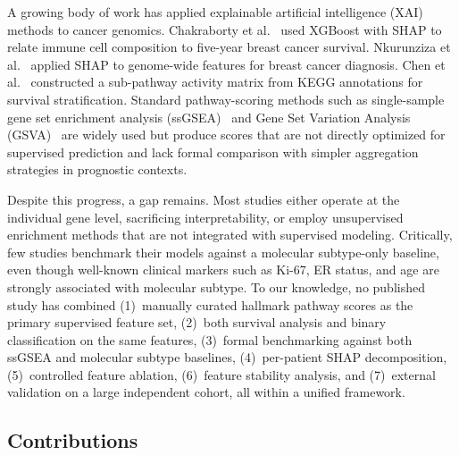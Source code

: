 \documentclass[journal]{IEEEtran}
\begin{document}
A growing body of work has applied explainable artificial intelligence (XAI) methods to cancer genomics. Chakraborty et al.~\cite{chakraborty2021} used XGBoost with SHAP to relate immune cell composition to five-year breast cancer survival. Nkurunziza et al.~\cite{nature2025shap} applied SHAP to genome-wide features for breast cancer diagnosis. Chen et al.~\cite{chen2021pathway} constructed a sub-pathway activity matrix from KEGG annotations for survival stratification. Standard pathway-scoring methods such as single-sample gene set enrichment analysis (ssGSEA)~\cite{barbie2009} and Gene Set Variation Analysis (GSVA)~\cite{hanzelmann2013} are widely used but produce scores that are not directly optimized for supervised prediction and lack formal comparison with simpler aggregation strategies in prognostic contexts.

Despite this progress, a gap remains. Most studies either operate at the individual gene level, sacrificing interpretability, or employ unsupervised enrichment methods that are not integrated with supervised modeling. Critically, few studies benchmark their models against a molecular subtype-only baseline, even though well-known clinical markers such as Ki-67, ER status, and age are strongly associated with molecular subtype. To our knowledge, no published study has combined (1)~manually curated hallmark pathway scores as the primary supervised feature set, (2)~both survival analysis and binary classification on the same features, (3)~formal benchmarking against both ssGSEA and molecular subtype baselines, (4)~per-patient SHAP decomposition, (5)~controlled feature ablation, (6)~feature stability analysis, and (7)~external validation on a large independent cohort, all within a unified framework.

\subsection{Contributions}
\end{document}
